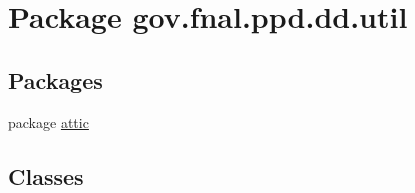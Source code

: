 \hypertarget{namespacegov_1_1fnal_1_1ppd_1_1dd_1_1util}{\section{Package gov.\-fnal.\-ppd.\-dd.\-util}
\label{namespacegov_1_1fnal_1_1ppd_1_1dd_1_1util}
}
\subsection*{Packages}
\begin{DoxyCompactItemize}
\item 
package \hyperlink{namespacegov_1_1fnal_1_1ppd_1_1dd_1_1util_1_1attic}{attic}
\end{DoxyCompactItemize}
\subsection*{Classes}
